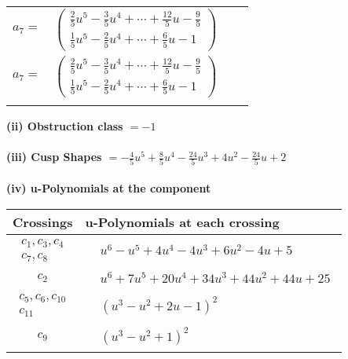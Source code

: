 \documentclass[1p]{elsarticle_modified}
\theoremstyle{definition}
\begin{document}
\begin{tabular}{m{7pt} m{180pt} m{7pt} m{180pt} }
\flushright $a_{7}=$&$\begin{pmatrix}\frac{2}{5} u^5-\frac{3}{5} u^4+\cdots+\frac{12}{5} u-\frac{9}{5}\\\frac{1}{5} u^5-\frac{2}{5} u^4+\cdots+\frac{6}{5} u-1\end{pmatrix}$\\ \flushright $a_{7}=$&$\begin{pmatrix}\frac{2}{5} u^5-\frac{3}{5} u^4+\cdots+\frac{12}{5} u-\frac{9}{5}\\\frac{1}{5} u^5-\frac{2}{5} u^4+\cdots+\frac{6}{5} u-1\end{pmatrix}$\\&\end{tabular}
\flushleft \textbf{(ii) Obstruction class $= -1$}\\~\\
\flushleft \textbf{(iii) Cusp Shapes $= -\frac{4}{5} u^5+\frac{8}{5} u^4-\frac{24}{5} u^3+4 u^2-\frac{24}{5} u+2$}\\~\\
\newpage\renewcommand{\arraystretch}{1}
\flushleft \textbf{(iv) u-Polynomials at the component}\newline \\
\begin{tabular}{m{50pt}|m{274pt}}
Crossings & \hspace{64pt}u-Polynomials at each crossing \\
\hline $$\begin{aligned}c_{1},c_{3},c_{4}\\c_{7},c_{8}\end{aligned}$$&$\begin{aligned}
&u^6- u^5+4 u^4-4 u^3+6 u^2-4 u+5
\end{aligned}$\\
\hline $$\begin{aligned}c_{2}\end{aligned}$$&$\begin{aligned}
&u^6+7 u^5+20 u^4+34 u^3+44 u^2+44 u+25
\end{aligned}$\\
\hline $$\begin{aligned}c_{5},c_{6},c_{10}\\c_{11}\end{aligned}$$&$\begin{aligned}
&(u^3- u^2+2 u-1)^2
\end{aligned}$\\
\hline $$\begin{aligned}c_{9}\end{aligned}$$&$\begin{aligned}
&(u^3- u^2+1)^2
\end{aligned}$\\
\hline
\end{tabular}\\~\\
\end{document}

